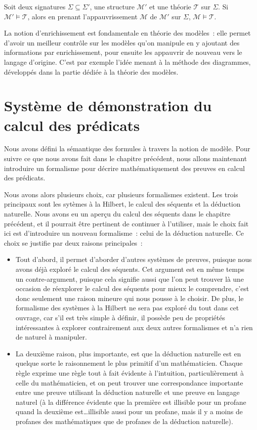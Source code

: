 \begin{corollary}
  Soit deux signatures $\Sigma\subseteq\Sigma'$, une structure $\mathcal M'$
  et une théorie $\mathcal T$ sur $\Sigma$. Si $\mathcal M'\models \mathcal T$,
  alors en prenant l'appauvrissement $\mathcal M$ de $\mathcal M'$ sur $\Sigma$,
  $\mathcal M\models \mathcal T$.
\end{corollary}

La notion d'enrichissement est fondamentale en théorie des modèles~: elle
permet d'avoir un meilleur contrôle sur les modèles qu'on manipule en y ajoutant
des informations par enrichissement, pour ensuite les appauvrir de nouveau vers
le langage d'origine. C'est par exemple l'idée menant à la méthode des
diagrammes, développés dans la partie dédiée à la théorie des modèles.

\section[Syntaxe de preuves]{Système de démonstration du calcul des prédicats}

Nous avons défini la sémantique des formules à travers la notion de modèle. Pour
suivre ce que nous avons fait dans le chapitre précédent, nous allons maintenant
introduire un formalisme pour décrire mathématiquement des preuves en calcul des
prédicats.

Nous avons alors plusieurs choix, car plusieurs formalismes existent. Les trois
principaux sont les sytèmes à la Hilbert, le calcul des séquents et la déduction
naturelle. Nous avons eu un aperçu du calcul des séquents dans le chapitre
précédent, et il pourrait être pertinent de continuer à l'utiliser, mais le
choix fait ici est d'introduire un nouveau formalisme~: celui de la déduction
naturelle. Ce choix se justifie par deux raisons principales~:
\begin{itemize}
\item Tout d'abord, il permet d'aborder d'autres systèmes de preuves, puisque
  nous avons déjà exploré le calcul des séquents. Cet argument est en même temps
  un contre-argument, puisque cela signifie aussi que l'on peut trouver là une
  occasion de réexplorer le calcul des séquents pour mieux le comprendre, c'est
  donc seulement une raison mineure qui nous pousse à le choisir. De plus, le
  formalisme des systèmes à la Hilbert ne sera pas exploré du tout dans cet
  ouvrage, car s'il est très simple à définir, il possède peu de propriétés
  intéressantes à explorer contrairement aux deux autres formalismes et n'a rien
  de naturel à manipuler.
\item La deuxième raison, plus importante, est que la déduction naturelle est en
  quelque sorte le raisonnement le plus primitif d'un mathématicien. Chaque
  règle exprime une règle tout à fait évidente à l'intuition, particulièrement à
  celle du mathématicien, et on peut trouver une correspondance importante
  entre une preuve utilisant la déduction naturelle et une preuve en langage
  naturel (à la différence évidente que la première est illisible pour un
  profane quand la deuxième est\ldots illisible aussi pour un profane, mais il y
  a moins de profanes des mathématiques que de profanes de la déduction
  naturelle).
\end{itemize}

